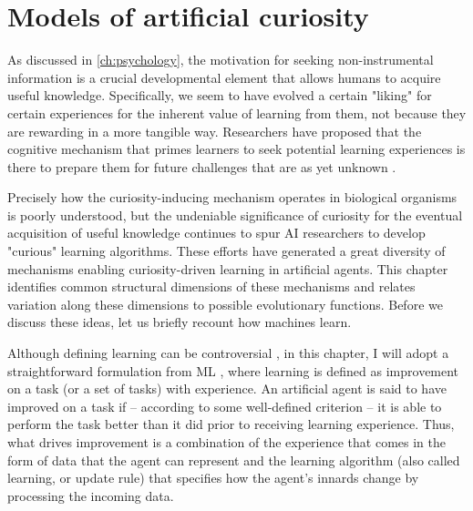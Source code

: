\chapter{Models of artificial curiosity}\label{ch:ai}

As discussed in \autoref{ch:psychology}, the motivation for seeking non-instrumental information is a crucial developmental element that allows humans to acquire useful knowledge. Specifically, we seem to have evolved a certain "liking" for certain experiences for the inherent value of learning from them, not because they are rewarding in a more tangible way. Researchers have proposed that the cognitive mechanism that primes learners to seek potential learning experiences is there to prepare them for future challenges that are as yet unknown \cite{oudeyer_computational_2018,gopnik_childhood_2020}.

Precisely how the curiosity-inducing mechanism operates in biological organisms is poorly understood, but the undeniable significance of curiosity for the eventual acquisition of useful knowledge continues to spur \ac{AI} researchers to develop "curious" learning algorithms. These efforts have generated a great diversity of mechanisms enabling curiosity-driven learning in artificial agents. This chapter identifies common structural dimensions of these mechanisms and relates variation along these dimensions to possible evolutionary functions. Before we discuss these ideas, let us briefly recount how machines learn.

Although defining learning can be controversial \cite{barron_embracing_2015}, in this chapter, I will adopt a straightforward formulation from \ac{ML} \cite{jordan_machine_2015}, where learning is defined as improvement on a task (or a set of tasks) with experience. An artificial agent is said to have improved on a task if -- according to some well-defined criterion -- it is able to perform the task better than it did prior to receiving learning experience. Thus, what drives improvement is a combination of the experience that comes in the form of data that the agent can represent and the learning algorithm (also called learning, or update rule) that specifies how the agent’s innards change by processing the incoming data.

